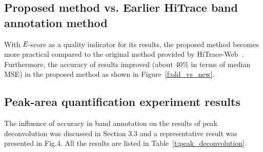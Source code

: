 \documentclass[letter]{bioinfo}
\newcommand{\escore}{{\emph{E}}}
\begin{document}
\subsection{ Proposed method vs. Earlier HiTrace band annotation method }
With $\escore$-score as a quality indicator for its results, the proposed method becomes more practical compared to the original method provided by HiTrace-Web~\citep{Kim2013}. Furthermore, the accuracy of results improved (about 40\% in terms of median MSE) in the proposed method as shown in Figure~\ref{f:old_vs_new}.


\subsection{ Peak-area quantification experiment results }
The influence of accuracy in band annotation on the results of peak deconvolution was discussed in Section 3.3 and a representative result was presented in Fig.4. All the results are listed in Table~\ref{t:peak_deconvolution}.





\onecolumn

\end{document}
